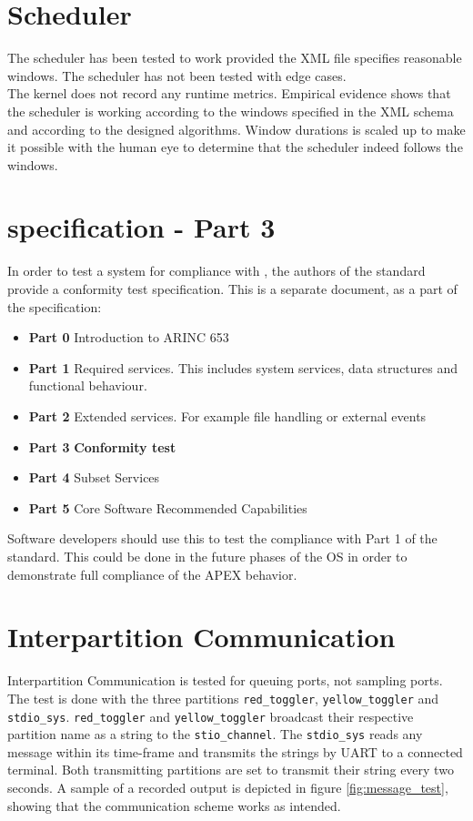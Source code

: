 \section{Scheduler}
The scheduler has been tested to work provided the XML file specifies reasonable
windows. The scheduler has not been tested with edge cases.\\
The kernel does not record any runtime metrics. Empirical
evidence shows that the scheduler is working according to the windows specified in the
XML schema and according to the designed algorithms. Window durations is
scaled up to make it possible with the human eye to determine that the scheduler
indeed follows the windows.


\section{\arinc{} specification - Part 3}
In order to test a system for compliance with \arinc{},
the authors of the standard provide a conformity test
specification. This is a separate document, as a part of the
\arinc{} specification:
\begin{itemize}
	\item\textbf{Part 0} Introduction to ARINC 653
	\item\textbf{Part 1} Required services. This includes system services,
	data structures and functional behaviour.
	\item\textbf{Part 2} Extended services. For example file handling or external events
	\item\textbf{Part 3} \textbf{Conformity test}
	\item\textbf{Part 4} Subset Services
	\item\textbf{Part 5} Core Software Recommended Capabilities
\end{itemize}

Software developers should use this to test the compliance with
Part 1 of the standard. This could be done in the future phases of the \OSname{} OS in order
to demonstrate full compliance of the APEX behavior.


\section{Interpartition Communication}
Interpartition Communication is tested for queuing ports, not sampling ports.
The test is done with the three partitions \texttt{red\_toggler},
\texttt{yellow\_toggler} and \texttt{stdio\_sys}. \texttt{red\_toggler} and
\texttt{yellow\_toggler} broadcast their respective partition name as a string
to the \texttt{stio\_channel}. The \texttt{stdio\_sys} reads any message within its
time-frame and transmits the strings by UART to a connected terminal. Both
transmitting partitions are set to transmit their string every two seconds. A
sample of a recorded output is depicted in figure \ref{fig:message_test},
showing that the communication scheme works as intended.

